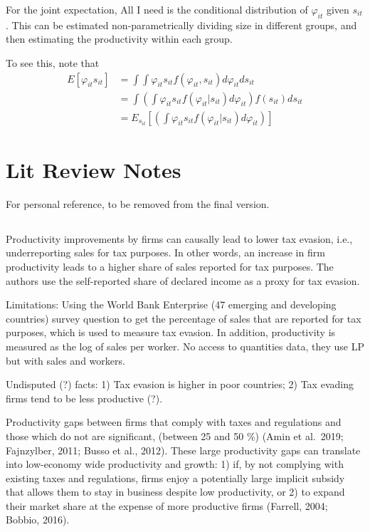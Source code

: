\documentclass[
  12pt]{article}
\theoremstyle{definition}
\theoremstyle{remark}
\begin{document}
For the joint expectation, All I need is the conditional distribution of
\(\varphi_{it}\) given \(s_{it}\). This can be estimated
non-parametrically dividing size in different groups, and then
estimating the productivity within each group.

To see this, note that \[
\begin{aligned}
    E[\varphi_{it} s_{it}] &= \int \int \varphi_{it} s_{it} f(\varphi_{it}, s_{it}) d\varphi_{it} ds_{it} \\
    &= \int \left(\int \varphi_{it} s_{it}  f(\varphi_{it}|s_{it}) d\varphi_{it}\right) f(s_{it}) ds_{it}\\
    &= E_{s_{it}}\left[ \left(\int \varphi_{it} s_{it}  f(\varphi_{it}|s_{it}) d\varphi_{it}\right) \right]
\end{aligned}
\]

\section{Lit Review Notes}\label{lit-review-notes}

For personal reference, to be removed from the final version.

\subsection{\texorpdfstring{\citet{Dabla2019}}{@Dabla2019}}\label{dabla2019}

Productivity improvements by firms can causally lead to lower tax
evasion, i.e., underreporting sales for tax purposes. In other words, an
increase in firm productivity leads to a higher share of sales reported
for tax purposes. The authors use the self-reported share of declared
income as a proxy for tax evasion.

Limitations: Using the World Bank Enterprise (47 emerging and developing
countries) survey question to get the percentage of sales that are
reported for tax purposes, which is used to measure tax evasion. In
addition, productivity is measured as the log of sales per worker. No
access to quantities data, they use LP but with sales and workers.

Undisputed (?) facts: 1) Tax evasion is higher in poor countries; 2) Tax
evading firms tend to be less productive (?).

Productivity gaps between firms that comply with taxes and regulations
and those which do not are significant, (between 25 and 50 \%) (Amin et
al.~2019; Fajnzylber, 2011; Busso et al., 2012). These large
productivity gaps can translate into low-economy wide productivity and
growth: 1) if, by not complying with existing taxes and regulations,
firms enjoy a potentially large implicit subsidy that allows them to
stay in business despite low productivity, or 2) to expand their market
share at the expense of more productive firms (Farrell, 2004; Bobbio,
2016).
\end{document}
